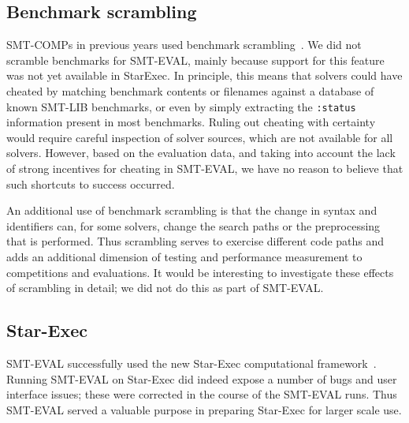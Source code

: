 \documentclass[smallcondensed]{svjour3}
\begin{document}
\subsection{Benchmark scrambling}

SMT-COMPs in previous years used benchmark scrambling~\cite{springerlink:10.1007/s10817-012-9246-5}.  We
did not scramble benchmarks for SMT-EVAL, mainly because support for
this feature was not yet available in StarExec.  In principle, this
means that solvers could have cheated by matching benchmark contents
or filenames against a database of known SMT-LIB benchmarks, or even
by simply extracting the {\tt :status} information present in most
benchmarks.  Ruling out cheating with certainty would require careful
inspection of solver sources, which are not available for all solvers.
However, based on the evaluation data, and taking into account the
lack of strong incentives for cheating in SMT-EVAL, we have no reason
to believe that such shortcuts to success occurred.

An additional use of benchmark scrambling is that the change in syntax
and identifiers can, for some solvers, change the search paths or the
preprocessing that is performed. Thus scrambling serves to exercise
different code paths and adds an additional dimension of testing and
performance measurement to competitions and evaluations. It would be
interesting to investigate these effects of scrambling in detail; we
did not do this as part of SMT-EVAL.


\subsection{Star-Exec}

SMT-EVAL successfully used the new Star-Exec computational framework~\cite{webStarExec,StuST-IJCAR-14}. Running SMT-EVAL on Star-Exec did indeed expose a number of bugs and user interface issues; these were corrected in the course of the SMT-EVAL runs. Thus SMT-EVAL served a valuable purpose in preparing Star-Exec for larger scale use.
\end{document}
